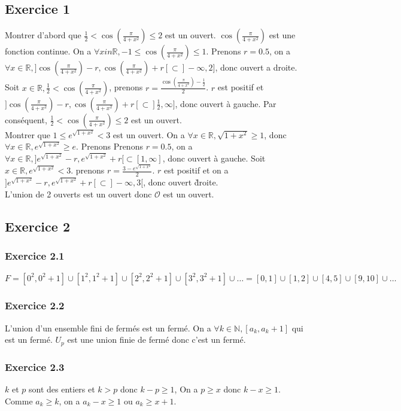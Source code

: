 \documentclass[]{book}
\theoremstyle{definition}
\newcommand{\bb}[1]{\mathbb{#1}}
\newcommand{\R}{\bb{R}}
\newcommand{\N}{\bb{N}}
\begin{document}
\newpage
\subsection*{Exercice 1}
Montrer d'abord que $\frac{1}{2} < \cos(\frac{\pi}{4+x^2}) \leq 2$ est un ouvert. $\cos(\frac{\pi}{4+x^2})$ est une fonction continue. On a $\forall x in \R, -1 \leq \cos(\frac{\pi}{4+x^2}) \leq 1$. Prenons $r=0.5$, on a $\forall x \in \R,]\cos(\frac{\pi}{4+x^2}) - r, \cos(\frac{\pi}{4+x^2}) +r[ \subset ]-\infty,2]$, donc ouvert a droite. Soit $x \in \R, \frac{1}{2} < \cos(\frac{\pi}{4+x^2})$, prenons $r= \frac{\cos(\frac{\pi}{4+x^2}) - \frac{1}{2}}{2}$. $r$ est positif et $]\cos(\frac{\pi}{4+x^2}) - r, \cos(\frac{\pi}{4+x^2}) +r[ \subset ]\frac{1}{2}, \infty]$, donc ouvert \`a gauche. Par cons\'equent, $\frac{1}{2} < \cos(\frac{\pi}{4+x^2}) \leq 2$ est un ouvert. \\

Montrer que $1 \leq e^{\sqrt{1+x^2}} < 3$ est un ouvert. On a $\forall x \in \R, \sqrt{1+x^2} \geq 1$, donc $\forall x \in \R, e^{\sqrt{1+x^2}} \geq e$. Prenons Prenons $r=0.5$, on a $\forall x \in \R,]e^{\sqrt{1+x^2}} - r, e^{\sqrt{1+x^2}} +r[ \subset [1,\infty]$, donc ouvert \`a gauche. Soit $x \in \R, e^{\sqrt{1+x^2}} < 3$. prenons $r=\frac{3-e^{\sqrt{1+x^2}}}{2}$. $r$ est positif et on a $]e^{\sqrt{1+x^2}}-r, e^{\sqrt{1+x^2}}+r[ \subset ]-\infty, 3[$, donc ouvert \` droite.\\


L'union de 2 ouverts est un ouvert donc $\mathscr{O}$ est un ouvert.


\subsection*{Exercice 2}
\subsubsection*{Exercice 2.1}
$F = [0^2, 0^2+1] \cup [1^2, 1^2+1] \cup [2^2, 2^2+1] \cup [3^2, 3^2+1] \cup \ldots = [0,1] \cup [1,2] \cup[4,5] \cup[9,10] \cup \ldots$

\subsubsection*{Exercice 2.2}
L'union d'un ensemble fini de ferm\'es est un ferm\'e. On a $\forall k \in \N, [a_k, a_k+1]$ qui est un ferm\'e. $U_p$ est une union finie de ferm\'e donc c'est un ferm\'e.

\subsubsection*{Exercice 2.3}
$k$ et $p$ sont des entiers et $k > p$ donc $k-p \geq 1$, On a $p \geq x$ donc $k-x \geq 1$. Comme $a_k \geq k$, on a $a_k - x \geq 1$ ou $a_k \geq x+1$. \\
\end{document}
